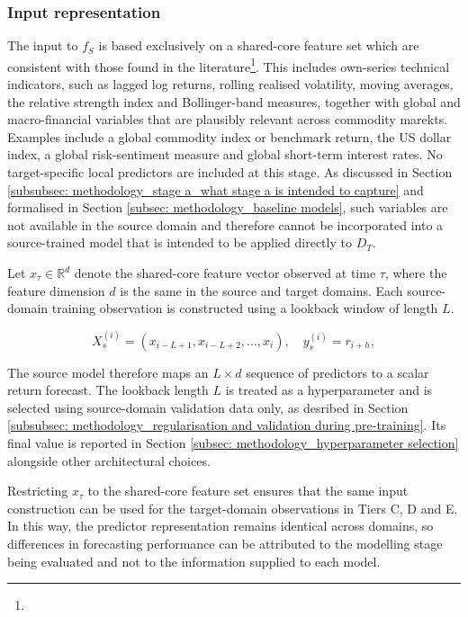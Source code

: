\subsubsection{Input representation} \label{subsubsec: methodology_stage a_input representation}
The input to $f_S$ is based exclusively on a shared-core feature set which are consistent with those found in the literature\footnote{}. This includes own-series technical indicators, such as lagged log returns, rolling realised volatility, moving averages, the relative strength index and Bollinger-band measures, together with global and macro-financial variables that are plausibly relevant across commodity marekts. Examples include a global commodity index or benchmark return, the US dollar index, a global risk-sentiment measure and global short-term interest rates. No target-specific local predictors are included at this stage. As discussed in Section \ref{subsubsec: methodology_stage a_what stage a is intended to capture} and formalised in Section \ref{subsec: methodology_baseline models}, such variables are not available in the source domain and therefore cannot be incorporated into a source-trained model that is intended to be applied directly to $D_T$.

Let $x_\tau \in \mathbb R^d$ denote the shared-core feature vector observed at time $\tau$, where the feature dimension $d$ is the same in the source and target domains. Each source-domain training observation is constructed using a lookback window of length $L$.

\begin{equation}
X_s^{(i)}=\left(x_{i-L+1}, x_{i-L+2}, \ldots, x_i\right), \quad y_s^{(i)}=r_{i+h},
\end{equation}

The source model therefore maps an $L \times d$ sequence of predictors to a scalar return forecast. The lookback length $L$ is treated as a hyperparameter and is selected using source-domain validation data only, as desribed in Section \ref{subsubsec: methodology_regularisation and validation during pre-training}. Its final value is reported in Section \ref{subsec: methodology_hyperparameter selection} alongside other architectural choices.

Restricting $x_\tau$ to the shared-core feature set ensures that the same input construction can be used for the target-domain observations in Tiers C, D and E. In this way, the predictor representation remains identical across domains, so differences in forecasting performance can be attributed to the modelling stage being evaluated and not to the information supplied to each model. 

